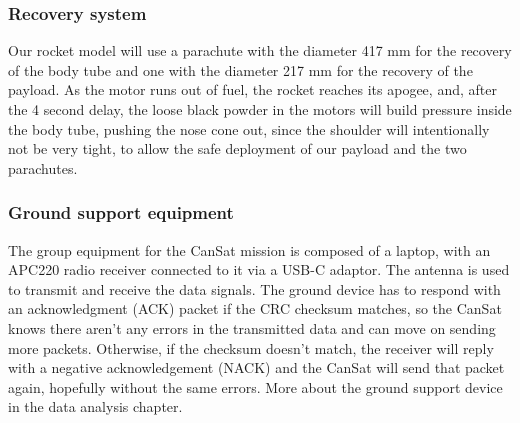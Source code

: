 \subsubsection{Recovery system}

Our rocket model will use a parachute with the diameter 417 mm for the recovery of the body tube and one with the diameter 217 mm for the recovery of the payload. As the motor runs out of fuel, the rocket reaches its apogee, and, after the 4 second delay, the loose black powder in the motors will build pressure inside the body tube, pushing the nose cone out, since the shoulder will intentionally not be very tight, to allow the safe deployment of our payload and the two parachutes.

\subsubsection{Ground support equipment}

The group equipment for the CanSat mission is composed of a laptop, with an APC220 radio receiver connected to it via a USB-C adaptor. The antenna is used to transmit and receive the data signals. The ground device has to respond with an acknowledgment (ACK) packet if the CRC checksum matches, so the CanSat knows there aren’t any errors in the transmitted data and can move on sending more packets. Otherwise, if the checksum doesn’t match, the receiver will reply with a negative acknowledgement (NACK) and the CanSat will send that packet again, hopefully without the same errors. More about the ground support device in the data analysis chapter. 